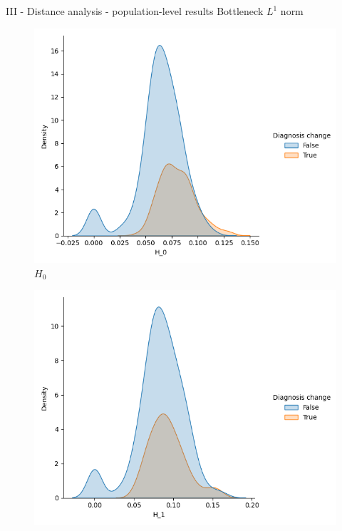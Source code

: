 \documentclass[aspectratio=169, 10pt, dvipsnames]{beamer}
\begin{document}
\begin{frame}[fragile]{III - Distance analysis - population-level results}
Bottleneck $L^1$ norm\\
  \begin{figure}
    \centering
    \includegraphics[width=\textwidth]{figures/temporal_evolution/bottleneck_H_0_dist_diag_change.png}
    \caption{$H_0$}
  \end{figure}
  \endminipage
  \hfill
  \begin{figure}
    \centering
    \includegraphics[width=\textwidth]{figures/temporal_evolution/bottleneck_H_1_dist_diag_change.png}

\end{figure}
\end{frame}
\end{document}
